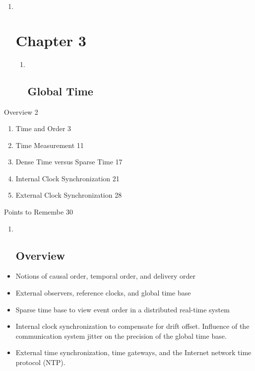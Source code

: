 \begin{enumerate}
\item ~
  \section{Chapter 3}\label{chapter-3}

  \begin{enumerate}
  \item ~
    \subsection{Global Time}\label{global-time}
  \end{enumerate}
\end{enumerate}

Overview 2

\begin{enumerate}
\def\labelenumi{\arabic{enumi}.}
\item
  Time and Order 3
\item
  Time Measurement 11
\item
  Dense Time versus Sparse Time 17
\item
  Internal Clock Synchronization 21
\item
  External Clock Synchronization 28
\end{enumerate}

Points to Remembe 30

\begin{enumerate}
\item ~
  \subsection{}\label{section}

  \subsection{Overview}\label{overview}
\end{enumerate}

\begin{itemize}
\item
  Notions of causal order, temporal order, and delivery order
\item
  External observers, reference clocks, and global time base
\item
  Sparse time base to view event order in a distributed real-time system
\item
  Internal clock synchronization to compensate for drift offset.
  Influence of the communication system jitter on the precision of the
  global time base.
\item
  External time synchronization, time gateways, and the Internet network
  time protocol (NTP).
\end{itemize}

